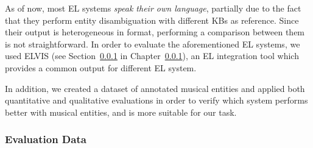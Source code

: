 

As of now, most \textsc{EL} systems \textit{speak their own language}, partially due to the fact that they perform entity disambiguation with different KBs as reference. Since their output is heterogeneous in format, performing a comparison between them is not straightforward. In order to evaluate the aforementioned EL systems, we used \textsc{ELVIS} (see Section~\ref{} in Chapter~\ref{}), an EL integration tool which provides a common output for different EL system.

In addition, we created a dataset of annotated musical entities and applied both quantitative and qualitative evaluations in order to verify which system performs better with musical entities, and is more suitable for our task.



\subsubsection{Evaluation Data}

